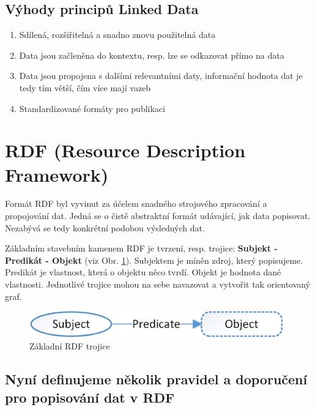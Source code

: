 \subsection*{Výhody principů Linked Data}

\begin{enumerate}
\item Sdílená, rozšiřitelná a snadno znovu použitelná data   
\item Data jsou začleněna do kontextu, resp. lze se odkazovat přímo na data
\item Data jsou propojena s dalšími relevantními daty, informační hodnota dat je tedy tím větší, čím více mají vazeb
\item Standardizované formáty pro publikaci
\end{enumerate}

\newpage

\section{RDF (Resource Description Framework)}
\label{sec:RDF}

Formát RDF byl vyvinut za účelem snadného strojového zpracování a propojování dat. Jedná se o čistě abstraktní formát udávající, jak data popisovat. Nezabývá se tedy konkrétní podobou výsledných dat. 

Základním stavebním kamenem RDF je tvrzení, resp. trojice: \textbf{Subjekt - Predikát - Objekt} (viz Obr. \ref{obr:rdf_basic}). Subjektem je míněn zdroj, který popisujeme. Predikát je vlastnost, která o objektu něco tvrdí. Objekt je hodnota dané vlastnosti. Jednotlivé trojice mohou na sebe navazovat a vytvořit tak orientovaný graf.

\begin{figure}[h]
\centerline{\includegraphics[width=110mm]{img/rdf_basic.eps}}
\caption{Základní RDF trojice}
\label{obr:rdf_basic}
\end{figure}

\subsection*{Nyní definujeme několik pravidel a doporučení pro popisování dat v RDF}

